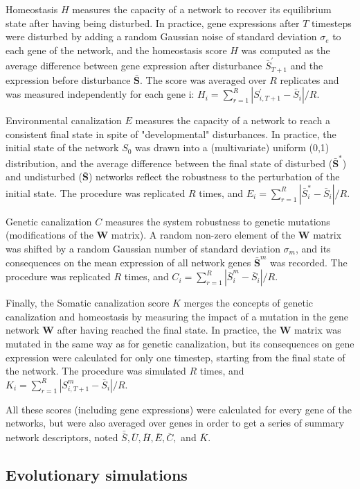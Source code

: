 \documentclass{article}
\begin{document}
Homeostasis $H$ measures the capacity of a network to recover its equilibrium state after having being disturbed. In practice, gene expressions after $T$ timesteps were disturbed by adding a random Gaussian noise of standard deviation $\sigma_e$ to each gene of the network, and the homeostasis score $H$ was computed as the average difference between gene expression after disturbance $\bar S^\prime_{T+1}$ and the expression before disturbance $\bar{\bm S}$. The score was averaged over $R$ replicates and was measured independently for each gene i: $H_i = \sum_{r=1}^R | S^\prime_{i,T+1} - \bar S_i| / R$. 

Environmental canalization $E$ measures the capacity of a network to reach a consistent final state in spite of "developmental" disturbances. In practice, the initial state of the network $S_0$ was drawn into a (multivariate) uniform (0,1) distribution, and the average difference between the final state of disturbed ($\bar{\bm S}^\ast$) and undisturbed ($\bar{\bm S}$) networks reflect the robustness to the perturbation of the initial state. The procedure was replicated $R$ times, and $E_i = \sum_{r=1}^R |\bar S^\ast_{i}-\bar S_i|/R$. 

Genetic canalization $C$ measures the system robustness to genetic mutations (modifications of the $\bm W$ matrix). A random non-zero element of the $\bm W$ matrix was shifted by a random Gaussian number of standard deviation $\sigma_m$, and its consequences on the mean expression of all network genes $\bar{\bm S}^m$ was recorded. The procedure was replicated $R$ times, and $C_i = \sum_{r=1}^R |\bar S^m_i - \bar S_i| / R$. 

Finally, the Somatic canalization score $K$ merges the concepts of genetic canalization and homeostasis by measuring the impact of a mutation in the gene network $\bm W$ after having reached the final state. In practice, the $\bm W$ matrix was mutated in the same way as for genetic canalization, but its consequences on gene expression were calculated for only one timestep, starting from the final state of the network. The procedure was simulated $R$ times, and $K_i = \sum_{r=1}^R |S^m_{i,T+1} - \bar S_i|/R$. 

All these scores (including gene expressions) were calculated for every gene of the networks, but were also averaged over genes in order to get a series of summary network descriptors, noted $\bar{\bar S}, \bar U, \bar H, \bar E, \bar C,$ and $\bar K$. 

\subsection{Evolutionary simulations}
\end{document}
